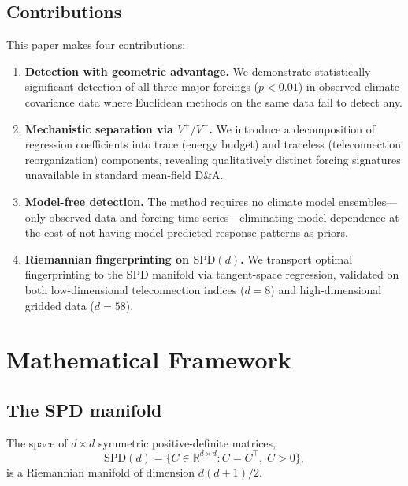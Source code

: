\documentclass[preprint,12pt]{elsarticle}
\newcommand{\SPD}{\mathrm{SPD}}
\newcommand{\RR}{\mathbb{R}}
\newcommand{\pval}{p}
\begin{document}
\subsection{Contributions}

This paper makes four contributions:

\begin{enumerate}
\item \textbf{Detection with geometric advantage.} We demonstrate statistically significant detection of all three major forcings ($\pval < 0.01$) in observed climate covariance data where Euclidean methods on the same data fail to detect any.

\item \textbf{Mechanistic separation via $V^+/V^-$.} We introduce a decomposition of regression coefficients into trace (energy budget) and traceless (teleconnection reorganization) components, revealing qualitatively distinct forcing signatures unavailable in standard mean-field D\&A.

\item \textbf{Model-free detection.} The method requires no climate model ensembles---only observed data and forcing time series---eliminating model dependence at the cost of not having model-predicted response patterns as priors.

\item \textbf{Riemannian fingerprinting on $\SPD(d)$.} We transport optimal fingerprinting to the SPD manifold via tangent-space regression, validated on both low-dimensional teleconnection indices ($d=8$) and high-dimensional gridded data ($d=58$).
\end{enumerate}


\section{Mathematical Framework}\label{sec:math}

\subsection{The SPD manifold}\label{sec:spd}

The space of $d \times d$ symmetric positive-definite matrices,
\begin{equation}
\SPD(d) = \bigl\{ C \in \RR^{d \times d} : C = C^\top,\; C > 0 \bigr\},
\end{equation}
is a Riemannian manifold of dimension $d(d+1)/2$.
\end{document}
